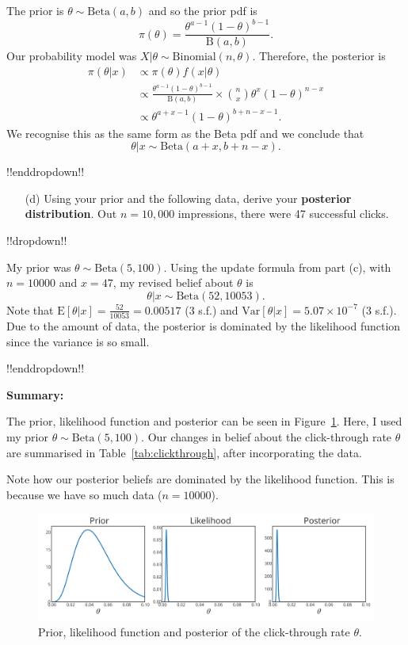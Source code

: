 {The prior is $\theta\sim \mathrm{Beta}(a,b)$ and so the prior pdf is
    $$ \pi(\theta) = \frac{\theta^{a-1}(1-\theta)^{b-1}}{\mathrm{B}(a,b)}.$$
    Our probability model was $X|\theta \sim \mathrm{Binomial}(n, \theta)$. Therefore, the posterior is
    \begin{align*}
        \pi(\theta|x) &\propto \pi(\theta) f(x|\theta) \\
        &\propto \frac{\theta^{a-1}(1-\theta)^{b-1}}{\mathrm{B}(a,b)} \times \binom{n}{x} \theta^{x}(1-\theta)^{n-x} \\
        &\propto \theta^{a + x - 1} (1-\theta)^{b + n - x - 1}.
    \end{align*}
    We recognise this as the same form as the Beta pdf and we conclude that $$\theta | x \sim \mathrm{Beta}(a + x, b + n - x).$$

!!enddropdown!!

\begin{itemize}
\item [(d)] Using your prior and the following data, derive your \textbf{\color{darkblue}posterior distribution}. Out $n=10,000$ impressions, there were 47 successful clicks.
\end{itemize}
!!dropdown!!

My prior was $\theta \sim \mathrm{Beta}(5, 100)$. Using the update formula from part (c), with $n = 10000$ and $x = 47$, my revised belief about $\theta$ is
    $$ \theta | x \sim \mathrm{Beta}(52, 10053). $$
    Note that $\text{E}[\theta|x] = \frac{52}{10053} = 0.00517$ (3 s.f.) and $\text{Var}[\theta|x] = 5.07\times 10^{-7}$ (3 s.f.). Due to the amount of data, the posterior is dominated by the likelihood function since the variance is so small.

!!enddropdown!!

\textbf{Summary:} 

The prior, likelihood function and posterior can be seen in Figure~\ref{fig:clickthrough}. Here, I used my prior $\theta \sim \mathrm{Beta}(5,100)$. Our changes in belief about the click-through rate $\theta$ are summarised in Table~\ref{tab:clickthrough}, after incorporating the data.

Note how our posterior beliefs are dominated by the likelihood function. This is because we have so much data ($n = 10000$). 

\begin{figure}[h] 

\includegraphics{images/clickthroughrate_priorposterior.svg}
\caption{Prior, likelihood function and posterior of the click-through rate $\theta$.}

\label{fig:clickthrough}
\end{figure}}

